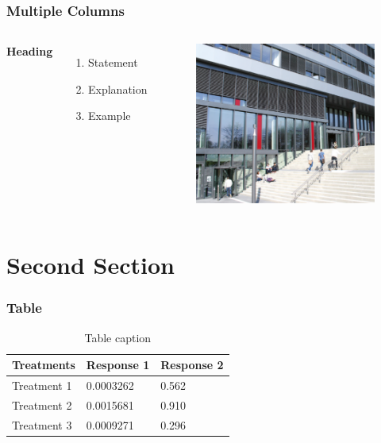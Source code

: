\documentclass{beamer}
\begin{document}

\begin{frame}
\frametitle{Multiple Columns}
\begin{columns}[c] %

\textbf{Heading}
\begin{enumerate}
\item Statement
\item Explanation
\item Example
\end{enumerate}

\begin{figure}
	\includegraphics[width=1\textwidth]{images/unibuilding.png}
\end{figure}


\end{columns}
\end{frame}

\section{Second Section}

\begin{frame}
\frametitle{Table}
\begin{table}
\begin{tabular}{l l l}
\toprule
\textbf{Treatments} & \textbf{Response 1} & \textbf{Response 2}\\
\midrule
Treatment 1 & 0.0003262 & 0.562 \\
Treatment 2 & 0.0015681 & 0.910 \\
Treatment 3 & 0.0009271 & 0.296 \\
\bottomrule
\end{tabular}
\caption{Table caption}
\end{table}
\end{frame}
\end{document}
